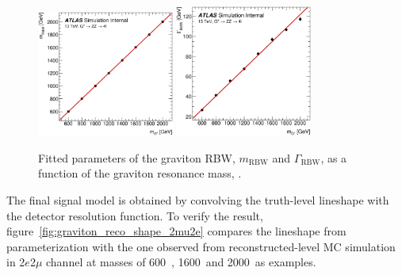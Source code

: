 \begin{figure}[htbp]
        \centering
        \includegraphics[width=0.4\textwidth]{figures/HMHZZ/signal/RSGraviton/graviton_param_m_RBW.eps}
        \includegraphics[width=0.4\textwidth]{figures/HMHZZ/signal/RSGraviton/graviton_param_G_RBW.eps}
        \caption{Fitted parameters of the graviton RBW, $m_{\text{RBW}}$ and $\Gamma_{\text{RBW}}$, as a function of the
        graviton resonance mass, \mG.}
        \label{fig:graviton_truth_param_vs_mG}
\end{figure}

The final signal model is obtained by convolving the truth-level lineshape with the detector resolution function.
To verify the result, figure~\ref{fig:graviton_reco_shape_2mu2e} compares the \mfl lineshape from parameterization with the one observed from reconstructed-level MC simulation in 2$e$2$\mu$ channel at masses of 600~\gev, 1600~\gev and 2000~\gev as examples.

